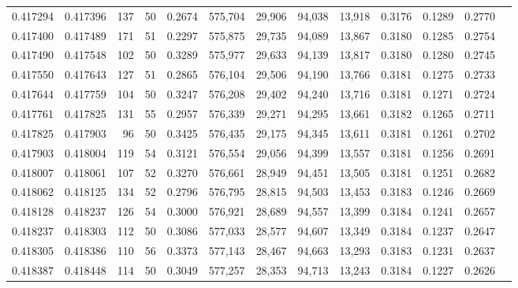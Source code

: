 \begin{tabular}{rrrrrrrrrrrrr}
0.417294 & 0.417396 &   137 &  50 &                                     0.2674 & 575,704 &  29,906 &  94,038 &  13,918 & 0.3176 & 0.1289 & 0.2770 \\
0.417400 & 0.417489 &   171 &  51 &                                     0.2297 & 575,875 &  29,735 &  94,089 &  13,867 & 0.3180 & 0.1285 & 0.2754 \\
0.417490 & 0.417548 &   102 &  50 &                                     0.3289 & 575,977 &  29,633 &  94,139 &  13,817 & 0.3180 & 0.1280 & 0.2745 \\
0.417550 & 0.417643 &   127 &  51 &                                     0.2865 & 576,104 &  29,506 &  94,190 &  13,766 & 0.3181 & 0.1275 & 0.2733 \\
0.417644 & 0.417759 &   104 &  50 &                                     0.3247 & 576,208 &  29,402 &  94,240 &  13,716 & 0.3181 & 0.1271 & 0.2724 \\
0.417761 & 0.417825 &   131 &  55 &                                     0.2957 & 576,339 &  29,271 &  94,295 &  13,661 & 0.3182 & 0.1265 & 0.2711 \\
0.417825 & 0.417903 &    96 &  50 &                                     0.3425 & 576,435 &  29,175 &  94,345 &  13,611 & 0.3181 & 0.1261 & 0.2702 \\
0.417903 & 0.418004 &   119 &  54 &                                     0.3121 & 576,554 &  29,056 &  94,399 &  13,557 & 0.3181 & 0.1256 & 0.2691 \\
0.418007 & 0.418061 &   107 &  52 &                                     0.3270 & 576,661 &  28,949 &  94,451 &  13,505 & 0.3181 & 0.1251 & 0.2682 \\
0.418062 & 0.418125 &   134 &  52 &                                     0.2796 & 576,795 &  28,815 &  94,503 &  13,453 & 0.3183 & 0.1246 & 0.2669 \\
0.418128 & 0.418237 &   126 &  54 &                                     0.3000 & 576,921 &  28,689 &  94,557 &  13,399 & 0.3184 & 0.1241 & 0.2657 \\
0.418237 & 0.418303 &   112 &  50 &                                     0.3086 & 577,033 &  28,577 &  94,607 &  13,349 & 0.3184 & 0.1237 & 0.2647 \\
0.418305 & 0.418386 &   110 &  56 &                                     0.3373 & 577,143 &  28,467 &  94,663 &  13,293 & 0.3183 & 0.1231 & 0.2637 \\
0.418387 & 0.418448 &   114 &  50 &                                     0.3049 & 577,257 &  28,353 &  94,713 &  13,243 & 0.3184 & 0.1227 & 0.2626 \\

\end{tabular}
